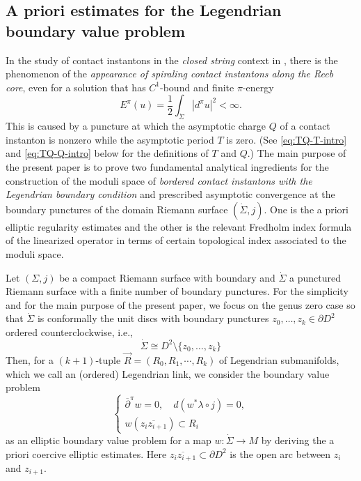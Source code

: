\documentclass[reqno]{amsart}
\newcommand{\del}{\partial}
\newcommand{\be}{\begin{equation}}
\newcommand{\ee}{\end{equation}}
\theoremstyle{theorem}
\theoremstyle{definition}
\numberwithin{equation}{section}
\def\delbar{{\overline \partial}}
\def\delbar{{\overline \partial}}
\begin{document}
\subsection{A priori estimates for the Legendrian boundary value problem}
\label{subsec:apriori-estimates}

In the study of contact instantons in the \emph{closed string} context in \cite{oh-wang:CR-map1,oh-wang:CR-map2},
there is the phenomenon of the \emph{appearance of spiraling contact instantons along the Reeb core}, even for a
solution that has $C^1$-bound and finite $\pi$-energy
$$
E^\pi(u) = \frac12 \int_{\dot \Sigma} |d^\pi u|^2 < \infty.
$$
This is caused by a puncture at which the asymptotic charge $Q$ of a contact instanton is nonzero while the asymptotic
period $T$ is zero. (See \eqref{eq:TQ-T-intro} and \eqref{eq:TQ-Q-intro} below for the definitions of $T$ and $Q$.)
The main purpose of the present paper is to prove two fundamental analytical ingredients
for the construction of the moduli space of \emph{bordered contact instantons with the Legendrian boundary condition}
and prescribed asymptotic convergence at the boundary punctures of the domain Riemann surface $(\dot \Sigma, j)$.
One is the a priori elliptic regularity estimates and the other is the relevant Fredholm index formula
of the linearized operator in terms of certain topological index associated to the moduli space.

Let $(\Sigma,j)$ be a compact Riemann surface with boundary and $\dot \Sigma$ a
punctured Riemann surface with a finite number of boundary punctures. For the simplicity and
for the main purpose of the present paper, we focus on the genus zero case so that $\dot \Sigma$
is conformally the unit discs with boundary punctures $z_0, \ldots, z_k \in \del D^2$ ordered
counterclockwise, i.e.,
$$
\dot \Sigma \cong D^2 \setminus \{z_0, \ldots, z_k\}
$$
Then, for a  $(k+1)$-tuple $\vec R = (R_0,R_1, \cdots, R_k)$ of Legendrian submanifolds, which we call
an (ordered) Legendrian link, we consider
the boundary value problem
\be\label{eq:contacton-Legendrian-bdy-intro}
\begin{cases}
\delbar^\pi w = 0, \quad d(w^*\lambda \circ j) = 0,\\
w(\overline{z_iz_{i+1}}) \subset R_i
\end{cases}
\ee
as an elliptic boundary value problem for a map $w: \dot \Sigma \to M$
by deriving the a priori coercive elliptic estimates. Here $\overline{z_iz_{i+1}} \subset \del D^2$
is the open arc between $z_i$ and $z_{i+1}$.
\end{document}
